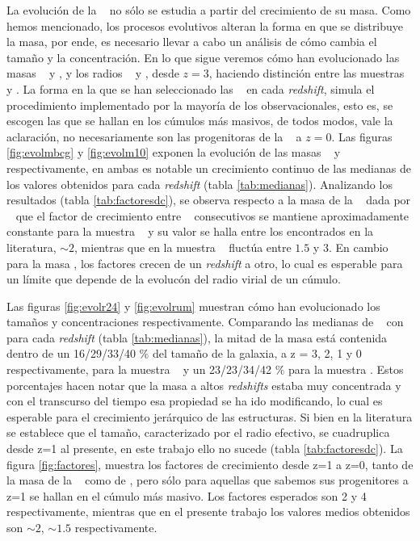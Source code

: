 La evoluci\'on de la \bcg~ no s\'olo se estudia a partir del crecimiento de su masa. Como
hemos mencionado, los procesos evolutivos alteran la forma en que se distribuye la masa, por ende, es necesario
llevar a cabo un an\'alisis de c\'omo cambia el tama\~no y la concentraci\'on.
En lo que sigue veremos c\'omo han evolucionado las masas
\mvc~ y \mdiez, y los radios \rvc~ y \rum, desde $z=3$, haciendo
distinci\'on entre las muestras
\cmay~ y \cmen.
La forma en la que se han seleccionado las \bcgs~ en cada \textit{redshift}, simula
el procedimiento implementado por la mayor\'ia de los observacionales,
esto es, se escogen las que se hallan en los c\'umulos m\'as masivos, de todos modos, vale la aclaraci\'on,
no necesariamente son las progenitoras de la \bcgs~ a $z=0$.
Las figuras \ref{fig:evolmbcg} y \ref{fig:evolm10} exponen la evoluci\'on de las masas \mvc~ y \mdiez~ respectivamente,
en ambas es notable un crecimiento continuo de las medianas de los valores
obtenidos para cada \textit{redshift} (tabla \ref{tab:medianas}).
Analizando los resultados (tabla \ref{tab:factoresdc}), se observa respecto
a la masa de la \bcg~ dada por \mvc~ que
el factor de crecimiento entre \z~ consecutivos
se mantiene aproximadamente constante para
la muestra \cmay~ y su valor 
se halla entre los encontrados en la literatura,
$\sim2$, mientras que en la muestra 
\cmen~ fluct\'ua entre $1.5$ y $3$.
En cambio para la masa \mdiez,
los factores crecen de un \textit{redshift} 
a otro, lo cual es esperable para un l\'imite que depende de
la evoluc\'on del radio virial de un c\'umulo.

Las figuras \ref{fig:evolr24} y \ref{fig:evolrum} 
muestran c\'omo han evolucionado
los tama\~nos y concentraciones respectivamente.
Comparando las medianas de \rvc~ con \rum~ para cada
\textit{redshift} (tabla \ref{tab:medianas}), la mitad de la masa est\'a contenida dentro
de un 16/29/33/40 $\%$ del
tama\~no de la galaxia, a z = 3, 2, 1 y 0 respectivamente, para
la muestra \cmay~ y un 23/23/34/42 $\%$ para la muestra \cmen.
Estos porcentajes hacen notar que la masa a altos \textit{redshifts}
estaba muy concentrada y con el transcurso del tiempo
esa propiedad se ha ido modificando, lo cual
es esperable para el crecimiento jer\'arquico de las
estructuras. Si bien en la literatura se establece
que el tama\~no, caracterizado por el radio efectivo,
se cuadruplica desde z=1 al presente, en este trabajo
ello no sucede (tabla \ref{tab:factoresdc}).
La figura \ref{fig:factores},
muestra los factores de crecimiento desde z=1 a z=0, tanto de la masa
de la \bcg~ como de \rum, pero s\'olo para aquellas \bcgs que sabemos
sus progenitores a z=1 se hallan en el c\'umulo
m\'as masivo. Los factores esperados son
2 y 4 respectivamente, mientras que en el presente
trabajo los valores medios obtenidos son $\sim2$, $\sim1.5$
respectivamente.

